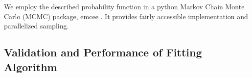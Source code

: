 \documentclass[twocolumn,traditabstract]{aa}
\begin{document}
We employ the described probability function in a python Markov Chain Monte Carlo (MCMC) package, emcee \citep{foreman2013}.
It provides fairly accessible implementation and parallelized sampling. 



\subsection{Validation and Performance of Fitting Algorithm}
\label{sec:validity}
\end{document}
